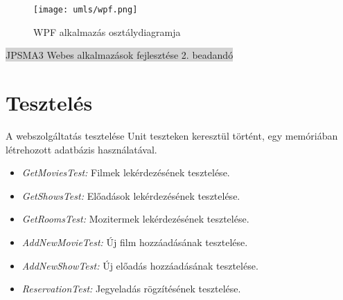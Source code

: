 \documentclass[11pt,a4paper]{article}
\begin{document}
\begin{figure}[h]
\centering
\texttt{[image: umls/wpf.png]}
\caption{WPF alkalmazás osztálydiagramja}
\end{figure}
\newpage
\begin{center}
	\colorbox{lightgray}{{\large JPSMA3} \hspace{3cm} {\large Webes alkalmazások fejlesztése 2. beadandó} \hspace{5cm} \thepage}
\end{center}

\section{Tesztelés}
A webszolgáltatás tesztelése Unit teszteken keresztül történt, egy memóriában létrehozott
adatbázis használatával.
\begin{itemize}
	\item\textit{GetMoviesTest:} Filmek lekérdezésének tesztelése.
	\item\textit{GetShowsTest:} Előadások lekérdezésének tesztelése.
	\item\textit{GetRoomsTest:} Mozitermek lekérdezésének tesztelése.
	\item\textit{AddNewMovieTest:} Új film hozzáadásának tesztelése.
	\item\textit{AddNewShowTest:} Új előadás hozzáadásának tesztelése.
	\item\textit{ReservationTest:} Jegyeladás rögzítésének tesztelése.
\end{itemize}
\end{document}
